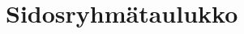 \chapter{Sidosryhmätaulukko}

\begin{landscape}
\begin{table}[]
\label{tab:sidosryhmataulukko}
	\caption{Sidosryhmätaulukko}
\end{table}
\end{landscape}
